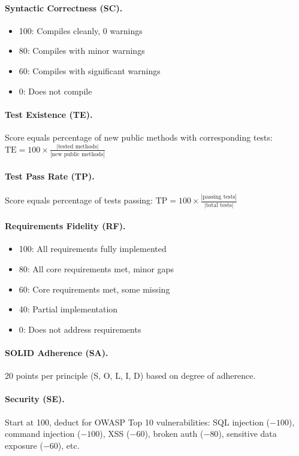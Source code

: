 \paragraph{Syntactic Correctness (SC).}
\begin{itemize}
    \item 100: Compiles cleanly, 0 warnings
    \item 80: Compiles with minor warnings
    \item 60: Compiles with significant warnings
    \item 0: Does not compile
\end{itemize}

\paragraph{Test Existence (TE).}
Score equals percentage of new public methods with corresponding tests:
$\text{TE} = 100 \times \frac{|\text{tested methods}|}{|\text{new public methods}|}$

\paragraph{Test Pass Rate (TP).}
Score equals percentage of tests passing:
$\text{TP} = 100 \times \frac{|\text{passing tests}|}{|\text{total tests}|}$

\paragraph{Requirements Fidelity (RF).}
\begin{itemize}
    \item 100: All requirements fully implemented
    \item 80: All core requirements met, minor gaps
    \item 60: Core requirements met, some missing
    \item 40: Partial implementation
    \item 0: Does not address requirements
\end{itemize}

\paragraph{SOLID Adherence (SA).}
20 points per principle (S, O, L, I, D) based on degree of adherence.

\paragraph{Security (SE).}
Start at 100, deduct for OWASP Top 10 vulnerabilities:
SQL injection ($-100$), command injection ($-100$), XSS ($-60$),
broken auth ($-80$), sensitive data exposure ($-60$), etc.

